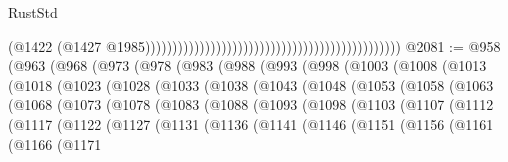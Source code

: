 \begin{lexlean}{RustStd}
\begin{coremodule}
                                                                                              (@1422
                                                                                                (@1427
                                                                                                  @1985)))))))))))))))))))))))))))))))))))))))))))))))
@2081 := @958
    (@963
      (@968
        (@973
          (@978
            (@983
              (@988
                (@993
                  (@998
                    (@1003
                      (@1008
                        (@1013
                          (@1018
                            (@1023
                              (@1028
                                (@1033
                                  (@1038
                                    (@1043
                                      (@1048
                                        (@1053
                                          (@1058
                                            (@1063
                                              (@1068
                                                (@1073
                                                  (@1078
                                                    (@1083
                                                      (@1088
                                                        (@1093
                                                          (@1098
                                                            (@1103
                                                              (@1107
                                                                (@1112
                                                                  (@1117
                                                                    (@1122
                                                                      (@1127
                                                                        (@1131
                                                                          (@1136
                                                                            (@1141
                                                                              (@1146
                                                                                (@1151
                                                                                  (@1156
                                                                                    (@1161
                                                                                      (@1166
                                                                                        (@1171

\end{coremodule}
\end{lexlean}
